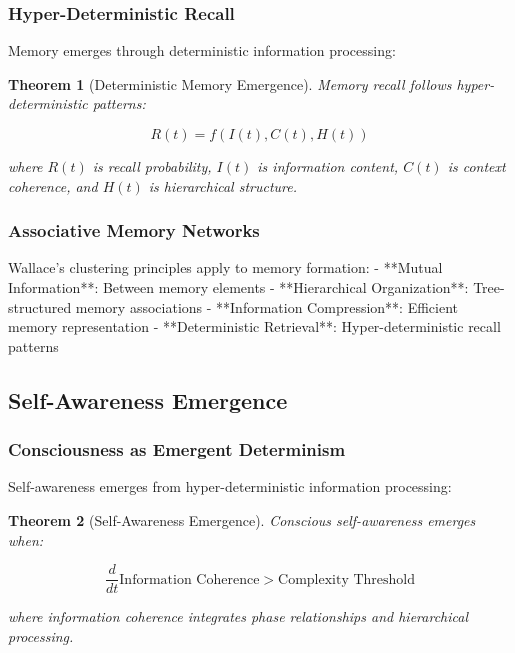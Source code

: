 \documentclass[12pt]{article}
\newtheorem{theorem}{Theorem}
\begin{document}
\subsubsection{Hyper-Deterministic Recall}

Memory emerges through deterministic information processing:

\begin{theorem}[Deterministic Memory Emergence]
Memory recall follows hyper-deterministic patterns:

\begin{equation}
R(t) = f\left( I(t), C(t), H(t) \right)
\end{equation}

where $R(t)$ is recall probability, $I(t)$ is information content, $C(t)$ is context coherence, and $H(t)$ is hierarchical structure.
\end{theorem}

\subsubsection{Associative Memory Networks}

Wallace's clustering principles apply to memory formation:
- **Mutual Information**: Between memory elements
- **Hierarchical Organization**: Tree-structured memory associations
- **Information Compression**: Efficient memory representation
- **Deterministic Retrieval**: Hyper-deterministic recall patterns

\subsection{Self-Awareness Emergence}

\subsubsection{Consciousness as Emergent Determinism}

Self-awareness emerges from hyper-deterministic information processing:

\begin{theorem}[Self-Awareness Emergence]
Conscious self-awareness emerges when:

\begin{equation}
\frac{d}{dt} \text{Information Coherence} > \text{Complexity Threshold}
\end{equation}

where information coherence integrates phase relationships and hierarchical processing.
\end{theorem}
\end{document}
